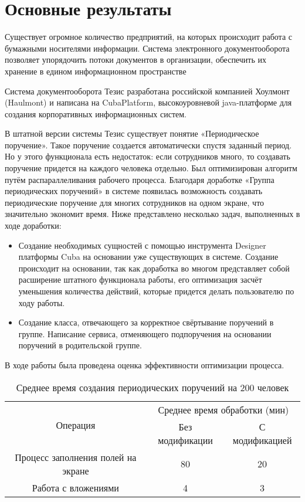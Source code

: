\section{Основные результаты}  


Существует огромное количество предприятий, на которых происходит работа с бумажными носителями информации. Система электронного документооборота позволяет упорядочить потоки документов в организации, обеспечить их хранение в едином информационном пространстве

Система документооборота Тезис \cite{Thesis1} разработана российской компанией Хоулмонт (Haulmont) и написана на CubaPlatform, высокоуровневой java-платформе для создания корпоративных информационных систем. 


 В штатной версии системы Тезис существует понятие «Периодическое поручение». Такое поручение создается автоматически спустя заданный период. Но у этого функционала есть недостаток: если сотрудников много, то создавать поручение придется на каждого человека отдельно. Был оптимизирован алгоритм путём распараллеливания рабочего процесса. Благодаря доработке «Группа периодических поручений» в системе появилась возможность создавать периодические поручение для многих сотрудников на одном экране, что значительно экономит время. Ниже представлено несколько задач, выполненных в ходе доработки:
 
\begin{itemize}
 \item Создание необходимых сущностей с помощью инструмента Designer платформы Cuba на основании уже существующих в системе. Создание происходит на основании, так как доработка во многом представляет собой расширение штатного функционала работы, его оптимизация засчёт уменьшения количества действий, которые придется делать пользователю по ходу работы.
 \item Создание класса, отвечающего за корректное свёртывание поручений в группе. Написание сервиса, отменяющего подпоручения на основании поручений в родительской группе.
\end{itemize}

В ходе работы была проведена оценка эффективности оптимизации процесса.

\begin{table}[htbp]
    \centering
    \caption{Среднее время создания периодических поручений на 200 человек}
    \begin{tabular}{|c|c|c|}
        \hline
        \multirow{2}{*}{Операция} & \multicolumn{2}{c|}{Среднее время обработки (мин)} \\ \cline{2-3}
         & Без модификации & С модификацией \\ \hline
        Процесс заполнения полей на экране & 80 & 20 \\ \hline
        Работа с вложениями  & 4 & 3 \\ \hline
    \end{tabular}
    \label{tab:my_table}
\end{table}

